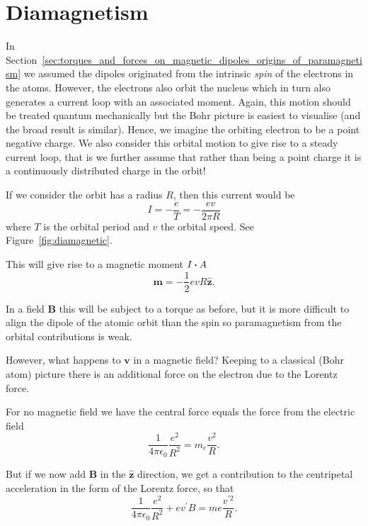 \documentclass[12pt,chapterprefix=false,dvipsnames]{scrbook}
\theoremstyle{dotless}
\theoremstyle{definition}
\begin{document}
\section{Diamagnetism}%
\label{sec:diamagnetism}

In Section~\ref{sec:torques_and_forces_on_magnetic_dipoles_origins_of_paramagnetism} we assumed the dipoles
originated from the intrinsic \textit{spin} of the
electrons in the atoms. However, the electrons also orbit the
nucleus which in turn also generates a current loop with an
associated moment. Again, this motion should be treated quantum
mechanically but the Bohr picture is easiest to visualise (and
the broad result is similar). Hence, we imagine the orbiting
electron to be a point negative charge. We also consider this
orbital motion to give rise to a steady current loop, that is we
further assume that rather than being a point charge it is a
continuously distributed charge in the orbit!

If we consider the orbit has a radius $R$,
then this current would be
\begin{equation}
	I = -\frac{e}{T} = -\frac{ev}{2\pi R}
\end{equation}
where $T$ is the orbital period and
$v$ the orbital speed. See
Figure~\ref{fig:diamagnetic}.

This will give rise to a magnetic moment $I\vdot A$
\begin{equation}
	\bm{m} = -\frac{1}{2} e v R
	\bm{\hat{z}}.
\end{equation}

In a field $\bm{B}$ this will be subject to a
torque as before, but it is more difficult to align the dipole
of the atomic orbit than the spin so paramagnetism from the
orbital contributions is weak.

However, what happens to $\bm{v}$ in a magnetic
field? Keeping to a classical (Bohr atom) picture there is an
additional force on the electron due to the Lorentz force.

For no magnetic field we have the central force equals the force
from the electric field
\begin{equation}
	\frac{1}{4\pi\epsilon_{0}}\frac{e^2}{R^2}
	=
	m_{e}\frac{v^2}{R}.
\end{equation}

But if we now add $\bm{B}$ in the
$\bm{\hat{z}}$ direction, we get a contribution to the
centripetal acceleration in the form of the Lorentz force, so
that
\begin{equation}
	\frac{1}{4\pi\epsilon_{0}}\frac{e^2}{R^2} +
	ev^{\prime}B
	=
	m e \frac{v^{\prime 2}}{R}.
\end{equation}
\end{document}
